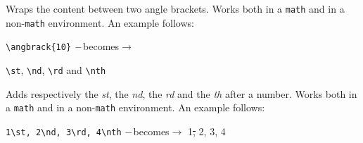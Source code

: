 \documentclass[]{notex}
\newcommand{\becomes}[1]{\hspace{#1} $\--$becomes$\rightarrow$ \hspace{#1}}
\begin{document}
\noindent Wraps the content between two angle brackets. Works both in a \texttt{math} and in a non-\texttt{math} environment. An example follows:
\begin{center}
    \verb|\angbrack{10}| \becomes{20pt} 
\end{center}

\begin{tcolorbox}
    \verb|\st|, \verb|\nd|, \verb|\rd| and \verb|\nth|
\end{tcolorbox}

\noindent Adds respectively the \textit{st}, the \textit{nd}, the \textit{rd} and the \textit{th} after a number. Works both in a \texttt{math} and in a non-\texttt{math} environment. An example follows:
\begin{center}
    \verb|1\st, 2\nd, 3\rd, 4\nth| \becomes{20pt} 1\st, 2\nd, 3\rd, 4\nth
\end{center}
\end{document}
